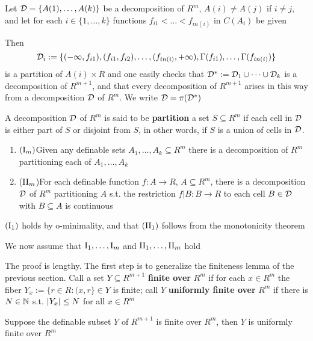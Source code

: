 \documentclass[11pt]{article}
\begin{document}
Let \(\mathcal{D}=\{A(1),\dots,A(k)\}\) be a decomposition of \(R^m\), \(A(i)\neq A(j)\) if \(i\neq j\), and let for
each \(i\in\{1,\dots,k\}\) functions \(f_{i1}<\dots<f_{in(i)}\) in \(C(A_i)\) be given

Then
\begin{equation*}
\mathcal{D}_i:=\{(-\infty,f_{i1}),(f_{i1},f_{i2}),\dots,(f_{in(i)},+\infty),\Gamma(f_{i1}),\dots,\Gamma(f_{in(i)})\}
\end{equation*}
is a partition of \(A(i)\times R\) and one easily checks that \(\mathcal{D}^*:=\mathcal{D}_1\cup\dots\cup\mathcal{D}_k\) is a decomposition
of \(R^{m+1}\), and that every decomposition of \(R^{m+1}\) arises in this way from a
decomposition \(\mathcal{D}\) of \(R^m\). We write \(\mathcal{D}=\pi(\mathcal{D}^*)\)

A decomposition \(\mathcal{D}\) of \(R^m\) is said to be \textbf{partition} a set \(S\subseteq R^m\) if each cell in \(\mathcal{D}\) is
either part of \(S\) or disjoint from \(S\), in other words, if \(S\) is a union of cells
in \(\mathcal{D}\).

\begin{theorem}
\begin{enumerate}
\item \((\text{\rom{1}}_m)\)Given any definable sets \(A_1,\dots,A_k\subseteq R^m\) there is a decomposition of \(R^m\) partitioning
each of \(A_1,\dots,A_k\)
\item (\(\text{\rom{2}}_m\))For each definable function \(f:A\to R\), \(A\subseteq R^m\), there is a decomposition \(\mathcal{D}\) of \(R^m\)
partitioning \(A\) s.t. the restriction \(f|B:B\to R\) to each cell \(B\in\mathcal{D}\) with \(B\subseteq A\) is continuous
\end{enumerate}
\end{theorem}

\((\text{\rom{1}}_1)\) holds by o-minimality, and that \((\text{\rom{2}}_1)\) follows from the monotonicity
theorem

We now assume that \(\text{\rom{1}}_1,\dots,\text{\rom{1}}_m\)
and \(\text{\rom{2}}_1,\dots,\text{\rom{2}}_m\) hold

The proof is lengthy. The first step is to generalize the finiteness lemma of the previous
section. Call a set \(Y\subseteq R^{m+1}\) \textbf{finite over} \(R^m\) if for each \(x\in R^m\) the
fiber \(Y_x:=\{r\in R:(x,r\}\in Y\) is finite; call \(Y\) \textbf{uniformly finite over} \(R^m\) if there
is \(N\in\mathbb{N}\) s.t. \(\abs{Y_x}\le N\) for all \(x\in R^m\)

\begin{lemma}
Suppose the definable subset \(Y\) of \(R^{m+1}\) is finite over \(R^m\), then \(Y\) is uniformly
finite over \(R^m\)
\end{lemma}
\end{document}
